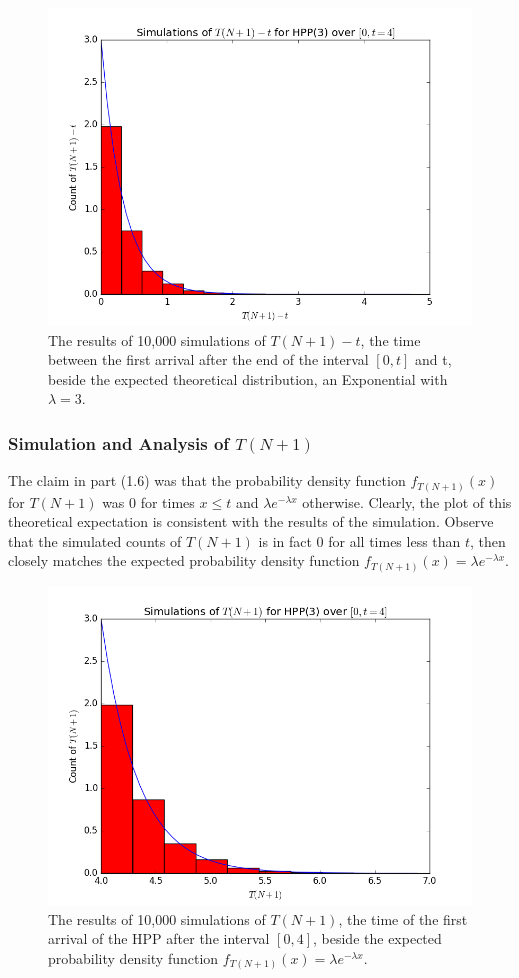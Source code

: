 \documentclass[11pt, oneside]{article}   	%
\begin{document}
\begin{figure}[H]
\includegraphics[scale=.45]{hpp_tn1_t}
\caption{The results of 10,000 simulations of $T(N+1)-t$, the time between the first arrival after the end of the interval $[0,t]$ and t, beside the expected theoretical distribution, an Exponential with $\lambda=3$.}
\label{fig:x}
\end{figure}

\subsubsection{Simulation and Analysis of $T(N+1)$}
The claim in part (1.6) was that the probability density function $f_{T(N+1)}(x)$ for $T(N+1)$ was 0 for times $x \leq t$ and $\lambda e^{-\lambda x}$ otherwise. Clearly, the plot of this theoretical expectation is consistent with the results of the simulation. Observe that the simulated counts of $T(N+1)$ is in fact 0 for all times less than $t$, then closely matches the expected probability density function $f_{T(N+1)}(x)=\lambda e^{-\lambda x}$.
\begin{figure}[H]
\includegraphics[scale=.5]{hpp_tn1}
\caption{The results of 10,000 simulations of $T(N+1)$, the time of the first arrival of the HPP after the interval $[0,4]$, beside the expected probability density function $f_{T(N+1)}(x)=\lambda e^{-\lambda x}$.}
\label{fig:x}
\end{figure}
\end{document}
